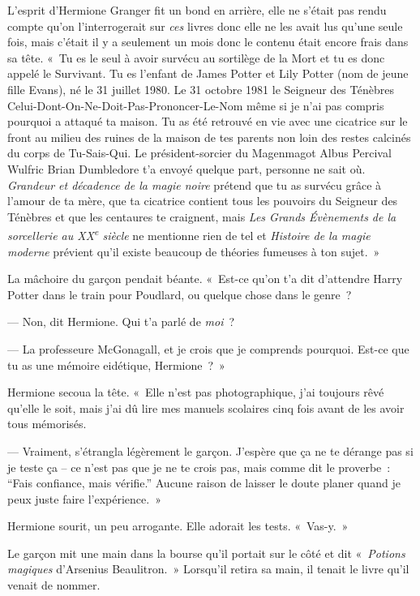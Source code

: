 L'esprit d'Hermione Granger fit un bond en arrière, elle ne s'était pas rendu compte qu'on l'interrogerait sur \emph{ces} livres donc elle ne les avait lus qu'une seule fois, mais c'était il y a seulement un mois donc le contenu était encore frais dans sa tête.
«~Tu es le seul à avoir survécu au sortilège de la Mort et tu es donc appelé le Survivant.
Tu es l'enfant de James Potter et Lily Potter (nom de jeune fille Evans), né le 31 juillet 1980.
Le 31 octobre 1981 le Seigneur des Ténèbres Celui-Dont-On-Ne-Doit-Pas-Prononcer-Le-Nom même si je n'ai pas compris pourquoi a attaqué ta maison.
Tu as été retrouvé en vie avec une cicatrice sur le front au milieu des ruines de la maison de tes parents non loin des restes calcinés du corps de Tu-Sais-Qui.
Le président-sorcier du Magenmagot Albus Percival Wulfric Brian Dumbledore t'a envoyé quelque part, personne ne sait où.
\emph{Grandeur et décadence de la magie noire} prétend que tu as survécu grâce à l'amour de ta mère, que ta cicatrice contient tous les pouvoirs du Seigneur des Ténèbres et que les centaures te craignent, mais \emph{Les Grands Évènements de la sorcellerie au XX\textsuperscript{e} siècle} ne mentionne rien de tel et \emph{Histoire de la magie moderne} prévient qu'il existe beaucoup de théories fumeuses à ton sujet.~»

La mâchoire du garçon pendait béante.
«~Est-ce qu'on t'a dit d'attendre Harry Potter dans le train pour Poudlard, ou quelque chose dans le genre~?

--- Non, dit Hermione. Qui t'a parlé de \emph{moi}~?

--- La professeure McGonagall, et je crois que je comprends pourquoi. Est-ce que tu as une mémoire eidétique, Hermione~?~»

Hermione secoua la tête.
«~Elle n'est pas photographique, j'ai toujours rêvé qu'elle le soit, mais j'ai dû lire mes manuels scolaires cinq fois avant de les avoir tous mémorisés.

--- Vraiment, s'étrangla légèrement le garçon.
J'espère que ça ne te dérange pas si je teste ça -- ce n'est pas que je ne te crois pas, mais comme dit le proverbe~: “Fais confiance, mais vérifie.”
Aucune raison de laisser le doute planer quand je peux juste faire l'expérience.~»

Hermione sourit, un peu arrogante.
Elle adorait les tests. «~Vas-y.~»

Le garçon mit une main dans la bourse qu'il portait sur le côté et dit «~\emph{Potions magiques} d'Arsenius Beaulitron.~»
Lorsqu'il retira sa main, il tenait le livre qu'il venait de nommer.

